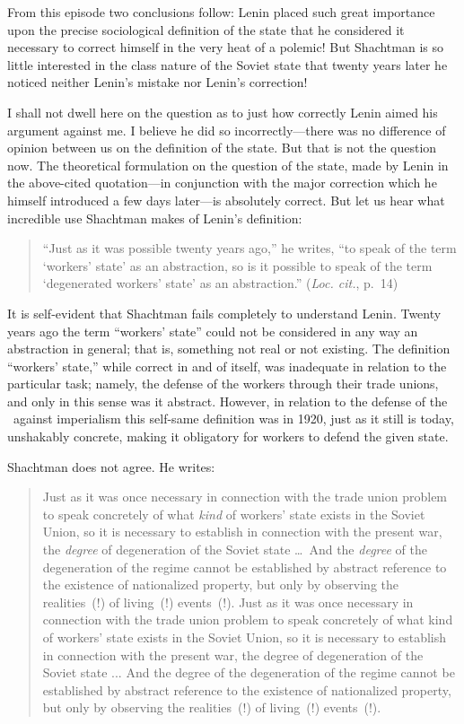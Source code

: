 From this episode two conclusions follow: Lenin placed such great importance upon the precise sociological definition of the state that he considered it necessary to correct himself in the very heat of a polemic! But Shachtman is so little interested in the class nature of the Soviet state that twenty years later he noticed neither Lenin’s mistake nor Lenin’s correction!

I shall not dwell here on the question as to just how correctly Lenin aimed his argument against me. I believe he did so incorrectly---there was no difference of opinion between us on the definition of the state. But that is not the question now. The theoretical formulation on the question of the state, made by Lenin in the above-cited quotation---in conjunction with the major correction which he himself introduced a few days later---is absolutely correct. But let us hear what incredible use Shachtman makes of Lenin’s definition:

\begin{quote}
  “Just as it was possible twenty years ago,” he writes, “to speak of the term ‘workers’ state’ as an abstraction, so is it possible to speak of the term ‘degenerated workers’ state’ as an abstraction.” (\emph{Loc. cit.}, p.~14)
\end{quote}

It is self-evident that Shachtman fails completely to understand Lenin. Twenty years ago the term “workers’ state” could not be considered in any way an abstraction in general; that is, something not real or not existing. The definition “workers’ state,” while correct in and of itself, was inadequate in relation to the particular task; namely, the defense of the workers through their trade unions, and only in this sense was it abstract. However, in relation to the defense of the \USSR\ against imperialism this self-same definition was in 1920, just as it still is today, unshakably concrete, making it obligatory for workers to defend the given state.

Shachtman does not agree. He writes:

\begin{quote}
  Just as it was once necessary in connection with the trade union problem to speak concretely of what \emph{kind} of workers’ state exists in the Soviet Union, so it is necessary to establish in connection with the present war, the \emph{degree} of degeneration of the Soviet state \dots\ And the \emph{degree} of the degeneration of the regime cannot be established by abstract reference to the existence of nationalized property, but only by observing the realities~(!) of living~(!) events~(!). Just as it was once necessary in connection with the trade union problem to speak concretely of what kind of workers’ state exists in the Soviet Union, so it is necessary to establish in connection with the present war, the degree of degeneration of the Soviet state ... And the degree of the degeneration of the regime cannot be established by abstract reference to the existence of nationalized property, but only by observing the realities~(!) of living~(!) events~(!).
\end{quote}

